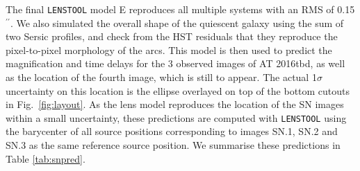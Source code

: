 \documentclass[12pt]{article}
\gdef\arcsec{$^{\prime\prime}$}
\def\SNABC{AT 2016tbd\xspace}
\def\lenstool{{\tt LENSTOOL}\xspace}
\begin{document}
{The final \lenstool model E reproduces all multiple systems with an RMS of 0.15\arcsec. We also simulated the overall shape of the quiescent galaxy using the sum of two Sersic profiles, and check from the HST residuals that they reproduce the pixel-to-pixel morphology of the arcs. This model is then used to predict the magnification and time delays for the 3 observed images of \SNABC, as well as the location of the fourth  image, which is still to appear. The actual 1$\sigma$ uncertainty on this location is the ellipse overlayed on top of the bottom cutouts in Fig.~\ref{fig:layout}. As the lens model reproduces the location of the SN images within a small uncertainty, these predictions are computed with \lenstool using the barycenter of all source positions corresponding to images SN.1, SN.2 and SN.3 as the same reference source position. We summarise these predictions in Table \ref{tab:snpred}.


}
\end{document}
